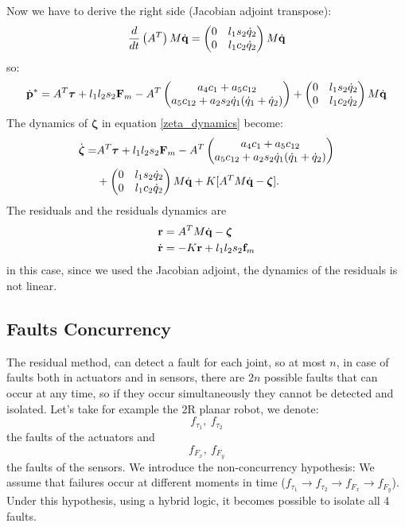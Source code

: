 \documentclass[10pt, a4paper]{report}
\begin{document}
Now we have to derive the right side (Jacobian adjoint transpose):\begin{align}
    \frac{d}{dt}\left(A^T\right)M{\dot{\mathbf q}}=\begin{pmatrix} 0 & l_1 s_2 \dot{q}_2 \\ 0 & l_1 c_2 \dot{q}_2 \end{pmatrix}M{\dot{\mathbf q}}
\end{align}
so:\begin{equation}
     \dot{\mathbf p}^*=A^T{\boldsymbol{\tau}}+l_1l_2s_2\mathbf F_m-A^T
    \begin{pmatrix}
        a_4c_1+a_5c_{12}\\
        a_5c_{12}+a_2s_2\dot q_1(\dot q_1+\dot q_2)
    \end{pmatrix}+\begin{pmatrix} 0 & l_1 s_2 \dot{q}_2 \\ 0 & l_1 c_2 \dot{q}_2 \end{pmatrix}M{\dot{\mathbf q}}
\end{equation}
The dynamics of $\boldsymbol{\zeta}$ in equation \eqref{zeta_dynamics} become:\begin{align}
    \dot{\boldsymbol{\zeta}}=&A^T{\boldsymbol{\tau}}+l_1l_2s_2\mathbf F_m-A^T
    \begin{pmatrix}
        a_4c_1+a_5c_{12}\\
        a_5c_{12}+a_2s_2\dot q_1(\dot q_1+\dot q_2)
    \end{pmatrix}\\ &+\begin{pmatrix} 0 & l_1 s_2 \dot{q}_2 \\ 0 & l_1 c_2 \dot{q}_2 \end{pmatrix}M{\dot{\mathbf q}}+
    K[A^TM{\dot{\mathbf q}}-\boldsymbol{\zeta}].
\end{align}
The residuals and the residuals dynamics are\begin{align}
    &\mathbf r=A^TM{\dot{\mathbf q}}-\boldsymbol{\zeta}\\
    &\dot{\mathbf r}=-K\mathbf r+l_1l_2s_2\mathbf f_m
\end{align}
in this case, since we used the Jacobian adjoint, the dynamics of the residuals is not linear.
\subsection{Faults Concurrency}
The residual method, can detect a fault for each joint, so at most $n$, in case of faults both in actuators and in sensors, there are $2n$ possible faults that can occur at any time, so if they occur simultaneously they cannot be detected and isolated. Let's take for example the 2R planar robot, we denote:\begin{equation}
    f_{\tau_1}, \ f_{\tau_2}
\end{equation}
the faults of the actuators and 
\begin{equation}
    f_{F_x}, \ f_{F_y}
\end{equation}
the faults of the sensors. We introduce the non-concurrency hypothesis: We assume that failures occur at different moments in time ($f_{\tau_1} \to f_{\tau_2} \to f_{F_x} \to f_{F_y}$). Under this hypothesis, using a hybrid logic, it becomes possible to isolate all 4 faults.\bigskip
\end{document}
